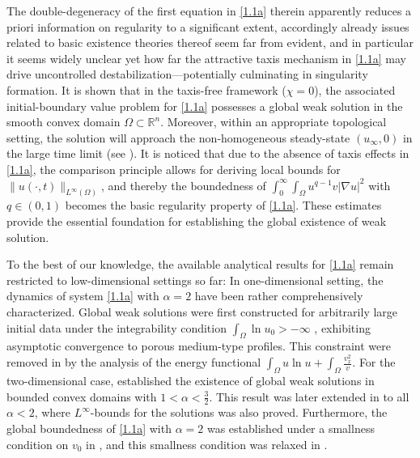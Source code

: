 \documentclass[12pt]{article}
\theoremstyle{plain}
\theoremstyle{definition}
\numberwithin{equation}{section}
\begin{document}
The double-degeneracy of the first equation  in  \eqref{1.1a} therein  apparently reduces a priori information on regularity to a significant extent, accordingly  already issues related to  %
basic existence theories thereof seem far from evident, and
in particular
 it seems widely unclear yet how far the attractive taxis mechanism
in \eqref{1.1a}  may drive uncontrolled destabilization---potentially culminating in singularity formation.
It is  shown that in the taxis-free framework %
($\chi=0$), the associated initial-boundary value problem for \eqref{1.1a} possesses a global weak solution in the smooth convex domain $\Omega\subset \mathbb{R}^n $. Moreover, within an appropriate topological setting,
  the solution will approach the non-homogeneous  steady-state $(u_\infty,0)$ in the large time limit
(see \cite{WCVPDE}).
  It is noticed that due to the  absence of taxis effects in \eqref{1.1a}, the comparison principle
  allows for deriving local bounds for  $\|u(\cdot,t)\|_{L^\infty(\Omega)}$, and thereby
   the boundedness of $\int_0^\infty\int_\Omega u^{q-1}v|\nabla u|^2$ with $ q\in(0,1) $ becomes the basic regularity property of \eqref{1.1a}.  These estimates provide the essential foundation for establishing the global existence of  weak solution.


 To the best of our knowledge,  the available analytical results for \eqref{1.1a}
  remain restricted to low-dimensional settings so far:
   In one-dimensional setting, the dynamics of system \eqref{1.1a} with $\alpha=2$ have been  rather comprehensively characterized. %
 Global weak solutions were first constructed for arbitrarily large initial data under the integrability condition $\int_\Omega \ln u_0>-\infty$ \cite{Winkler3}, exhibiting asymptotic convergence to porous medium-type profiles. This constraint  were removed in  \cite{Li Winkler} by the analysis of the energy functional $\int_\Omega u\ln u+\int_\Omega \frac{v_x^2}{v}$. For the two-dimensional case, \cite{LiJDE} established the existence of global weak solutions in bounded convex domains with $1<\alpha<\frac3 2$. This result was later extended in  \cite{WJDE}  to all  $\alpha<2$, where  $L^{\infty}$-bounds for the solutions was also proved. Furthermore, the global boundedness of \eqref{1.1a} with $\alpha=2$ was established under a smallness condition on $v_0$  in \cite{WNARWA},  and this smallness condition was relaxed in \cite{ZhangLi}.
\end{document}
